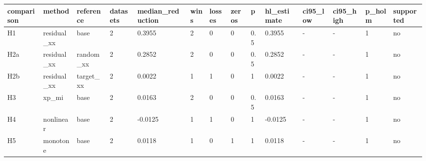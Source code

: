 \begin{tabular}{llllllllllllll}
\toprule
comparison & method & reference & datasets & median\_reduction & wins & losses & zeros & p & hl\_estimate & ci95\_low & ci95\_high & p\_holm & supported \\
\midrule
H1 & residual\_xx & base & 2 & 0.3955 & 2 & 0 & 0 & 0.5 & 0.3955 & - & - & 1 & no \\
H2a & residual\_xx & random\_xx & 2 & 0.2852 & 2 & 0 & 0 & 0.5 & 0.2852 & - & - & 1 & no \\
H2b & residual\_xx & target\_xx & 2 & 0.0022 & 1 & 1 & 0 & 1 & 0.0022 & - & - & 1 & no \\
H3 & xp\_mi & base & 2 & 0.0163 & 2 & 0 & 0 & 0.5 & 0.0163 & - & - & 1 & no \\
H4 & nonlinear & base & 2 & -0.0125 & 1 & 1 & 0 & 1 & -0.0125 & - & - & 1 & no \\
H5 & monotone & base & 2 & 0.0118 & 1 & 0 & 1 & 1 & 0.0118 & - & - & 1 & no \\
\bottomrule
\end{tabular}
